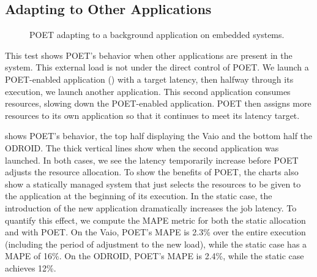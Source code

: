 \subsection{Adapting to Other Applications}

\begin{figure}[t]
  \centering
      
  \caption{POET adapting to a background application on embedded systems.}
  \label{fig:poet-embedded-multiapp}
\end{figure}

This test shows POET's behavior when other applications are present in the system.
This external load is not under the direct control of POET.
We launch a POET-enabled application () with a target latency, then halfway through its execution, we launch another application.
This second application consumes resources, slowing down the POET-enabled application.
POET then assigns more resources to its own application so that it continues to meet its latency target.

 shows POET's behavior, the top half displaying the Vaio and the bottom half the ODROID.
The thick vertical lines show when the second application was launched.
In both cases, we see the latency temporarily increase before POET adjusts the resource allocation.
To show the benefits of POET, the charts also show a statically managed system that just selects the resources to be given to the application at the beginning of its execution.
In the static case, the introduction of the new application dramatically increases the job latency.
To quantify this effect, we compute the MAPE metric for both the static allocation and with POET.
On the Vaio, POET's MAPE is 2.3\% over the entire execution (including the period of adjustment to the new load), while the static case has a MAPE of 16\%.
On the ODROID, POET's MAPE is 2.4\%, while the static case achieves 12\%.
